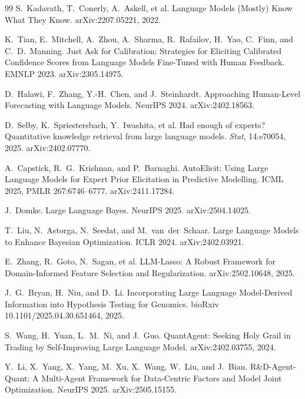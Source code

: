 \documentclass[11pt]{article}
\begin{document}
\begin{thebibliography}{99}
 S.~Kadavath, T.~Conerly, A.~Askell, et al.
\newblock Language Models (Mostly) Know What They Know.
\newblock arXiv:2207.05221, 2022.

 K.~Tian, E.~Mitchell, A.~Zhou, A.~Sharma, R.~Rafailov, H.~Yao, C.~Finn, and
C.~D.~Manning.
\newblock Just Ask for Calibration: Strategies for Eliciting Calibrated Confidence Scores from Language
Models Fine-Tuned with Human Feedback.
\newblock EMNLP 2023. arXiv:2305.14975.

 D.~Halawi, F.~Zhang, Y.-H.~Chen, and J.~Steinhardt.
\newblock Approaching Human-Level Forecasting with Language Models.
\newblock NeurIPS 2024. arXiv:2402.18563.

 D.~Selby, K.~Spriestersbach, Y.~Iwashita, et al.
\newblock Had enough of experts? Quantitative knowledge retrieval from large language models.
\newblock \emph{Stat}, 14:e70054, 2025. arXiv:2402.07770.

 A.~Capstick, R.~G.~Krishnan, and P.~Barnaghi.
\newblock AutoElicit: Using Large Language Models for Expert Prior Elicitation in Predictive Modelling.
\newblock ICML 2025, PMLR 267:6746--6777. arXiv:2411.17284.

 J.~Domke.
\newblock Large Language Bayes.
\newblock NeurIPS 2025. arXiv:2504.14025.

 T.~Liu, N.~Astorga, N.~Seedat, and M.~van~der~Schaar.
\newblock Large Language Models to Enhance Bayesian Optimization.
\newblock ICLR 2024. arXiv:2402.03921.

 E.~Zhang, R.~Goto, N.~Sagan, et al.
\newblock LLM-Lasso: A Robust Framework for Domain-Informed Feature Selection and Regularization.
\newblock arXiv:2502.10648, 2025.

 J.~G.~Bryan, H.~Niu, and D.~Li.
\newblock Incorporating Large Language Model-Derived Information into Hypothesis Testing for Genomics.
\newblock bioRxiv 10.1101/2025.04.30.651464, 2025.

 S.~Wang, H.~Yuan, L.~M.~Ni, and J.~Guo.
\newblock QuantAgent: Seeking Holy Grail in Trading by Self-Improving Large Language Model.
\newblock arXiv:2402.03755, 2024.

 Y.~Li, X.~Yang, X.~Yang, M.~Xu, X.~Wang, W.~Liu, and J.~Bian.
\newblock R\&D-Agent-Quant: A Multi-Agent Framework for Data-Centric Factors and Model Joint
Optimization.
\newblock NeurIPS 2025. arXiv:2505.15155.


\end{thebibliography}
\end{document}
